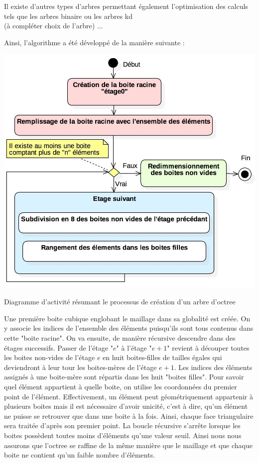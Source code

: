 Il existe d'autres types d'arbres permettant également l'optimisation des calculs tels que les arbres binaire ou les arbres kd \\
(à compléter choix de l'arbre) ...

Ainsi, l'algorithme a été développé de la manière suivante :

\begin{figureth}
	\includegraphics[width=0.8\linewidth]{images/DiagOctree}
	\caption{Diagramme d'activité résumant le processus de création d'un arbre d'octree}
	\label{DiagOctree}
\end{figureth}

Une première boite cubique englobant le maillage dans sa globalité est créée. On y associe les indices de l'ensemble des éléments puisqu'ils sont tous contenus dans cette "boite racine". On va ensuite, de manière récursive descendre dans des étages successifs. Passer de l'étage "$e$" à l'étage "$e+1$" revient à découper toutes les boites non-vides de l'étage $e$ en huit boites-filles de tailles égales qui deviendront à leur tour les boites-mères de l'étage $e+1$. Les indices des éléments assignés à une boite-mère sont répartis dans les huit "boites filles". Pour savoir quel élément appartient à quelle boite, on utilise les coordonnées du premier point de l'élément. Effectivement, un élément peut géométriquement appartenir à plusieurs boites mais il est nécessaire d'avoir unicité, c'est à dire, qu'un élément ne puisse se retrouver que dans une boite à la fois. Ainsi, chaque face triangulaire sera traitée d'après son premier point. La boucle récursive s'arrête lorsque les boites possèdent toutes moins d'éléments qu'une valeur seuil. Ainsi nous nous assurons que l'\gls{octree} se raffine de la même manière que le maillage et que chaque boite ne contient qu'un faible nombre d'éléments.


